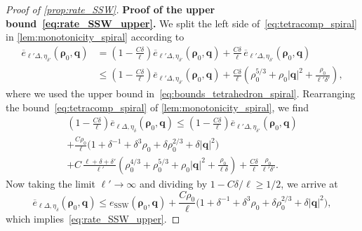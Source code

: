 \documentclass[final,reqno]{amsart}
\theoremstyle{remark}
\renewcommand{\le}{\leqslant}
\renewcommand{\ge}{\geqslant}
\newcommand{\ol}[1]{\overline{#1}}
\newcommand{\SSW}{\mathrm{SSW}}
\newcommand{\tetra}{\mathbb{\Delta}}
\begin{document}
\begin{proof}[Proof of \cref{prop:rate_SSW}]
\noindent\textbf{Proof of the upper bound~\cref{eq:rate_SSW_upper}.} We split the left side of~\cref{eq:tetracomp_spiral} in \cref{lem:monotonicity_spiral} according to
\begin{align*}
 \ol e_{\ell'\tetra,\eta_{\delta'}}(\bm{\rho}_0,\mathbf{q})
 &=\left(1-\frac{C\delta}{\ell}\right)\ol e_{\ell'\tetra,\eta_{\delta'}}(\bm{\rho}_0,\mathbf{q})+\frac{C\delta}{\ell}\,\ol e_{\ell'\tetra,\eta_{\delta'}}(\bm{\rho}_0,\mathbf{q})\\
 &\le\left(1-\frac{C\delta}{\ell}\right)\ol e_{\ell'\tetra,\eta_{\delta'}}(\bm{\rho}_0,\mathbf{q})
 +\frac{C\delta}{\ell}\left(\rho_0^{5/3}+\rho_0|\mathbf{q}|^2+\frac{\rho_0}{\ell'\delta'}\right),
\end{align*}
where we used the upper bound in~\cref{eq:bounds_tetrahedron_spiral}. Rearranging the bound~\cref{eq:tetracomp_spiral} of \cref{lem:monotonicity_spiral}, we find
\begin{multline*}
 \left(1-\frac{C\delta}{\ell}\right)\ol e_{\ell\tetra,\eta_\delta}(\bm{\rho}_0,\mathbf{q})
 \le\left(1-\frac{C\delta}{\ell}\right)\ol e_{\ell'\tetra,\eta_{\delta'}}(\bm{\rho}_0,\mathbf{q})\\
 +\frac{C\rho_0}{\ell}\Big(1+\delta^{-1}+\delta^3\rho_0+\delta\rho_0^{2/3}+\delta|\mathbf{q}|^2\Big)\\
 +C\,\frac{\ell+\delta+\delta'}{\ell'}\left(\rho_0^{4/3}+\rho_0^{5/3}+\rho_0|\mathbf{q}|^2+\frac{\rho_0}{\ell\delta}\right)
 +\frac{C\delta}{\ell}\,\frac{\rho_0}{\ell'\delta'}.
\end{multline*}
Now taking the limit $\ell'\to\infty$ and dividing by $1-C\delta/\ell\ge1/2$, we arrive at
\[
 \ol e_{\ell\tetra,\eta_\delta}(\bm{\rho}_0,\mathbf{q})\le e_\SSW(\bm{\rho}_0,\mathbf{q})
 +\frac{C\rho_0}{\ell}\Big(1+\delta^{-1}+\delta^3\rho_0+\delta\rho_0^{2/3}+\delta|\mathbf{q}|^2\Big),
\]
which implies~\cref{eq:rate_SSW_upper}.

\medskip


\end{proof}
\end{document}
